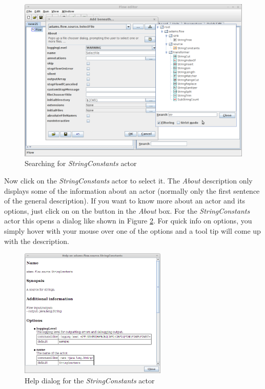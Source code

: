 \begin{figure}[htb]
  \centering
  \includegraphics[width=12.0cm]{images/floweditor-helloworld-addactor3.png}
  \caption{Searching for \textit{StringConstants} actor}
  \label{floweditor-helloworld-addactor3}
\end{figure}

Now click on the \textit{StringConstants} actor to select it. The \textit{About}
description only displays some of the information about an actor (normally only
the first sentence of the general description). If you want to know more about
an actor and its options, just click on on the  button in the
\textit{About} box. For the \textit{StringConstants} actor this opens a dialog
like shown in Figure \ref{floweditor-helloworld-actorhelp}. For quick info on
options, you simply hover with your mouse over one of the options and a tool tip
will come up with the description.

\begin{figure}[htb]
  \centering
  \includegraphics[width=7.0cm]{images/floweditor-helloworld-actorhelp.png}
  \caption{Help dialog for the \textit{StringConstants} actor}
  \label{floweditor-helloworld-actorhelp}
\end{figure}

